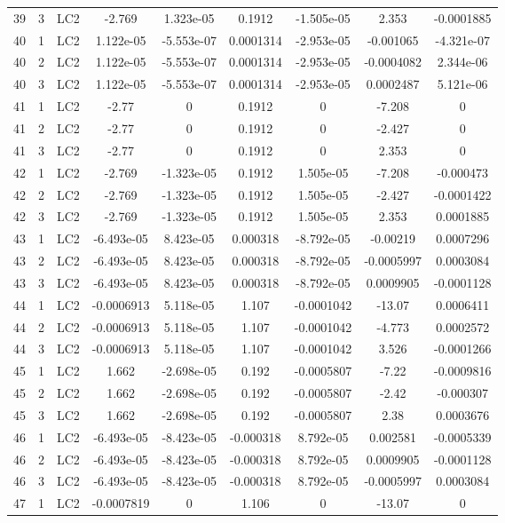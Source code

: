 \documentclass{article}%
\begin{document}
\begin{longtable}{| c c c | c c c c c c |}
39&3&LC2&{-}2.769&1.323e{-}05&0.1912&{-}1.505e{-}05&2.353&{-}0.0001885\\%
40&1&LC2&1.122e{-}05&{-}5.553e{-}07&0.0001314&{-}2.953e{-}05&{-}0.001065&{-}4.321e{-}07\\%
40&2&LC2&1.122e{-}05&{-}5.553e{-}07&0.0001314&{-}2.953e{-}05&{-}0.0004082&2.344e{-}06\\%
40&3&LC2&1.122e{-}05&{-}5.553e{-}07&0.0001314&{-}2.953e{-}05&0.0002487&5.121e{-}06\\%
41&1&LC2&{-}2.77&0&0.1912&0&{-}7.208&0\\%
41&2&LC2&{-}2.77&0&0.1912&0&{-}2.427&0\\%
41&3&LC2&{-}2.77&0&0.1912&0&2.353&0\\%
42&1&LC2&{-}2.769&{-}1.323e{-}05&0.1912&1.505e{-}05&{-}7.208&{-}0.000473\\%
42&2&LC2&{-}2.769&{-}1.323e{-}05&0.1912&1.505e{-}05&{-}2.427&{-}0.0001422\\%
42&3&LC2&{-}2.769&{-}1.323e{-}05&0.1912&1.505e{-}05&2.353&0.0001885\\%
43&1&LC2&{-}6.493e{-}05&8.423e{-}05&0.000318&{-}8.792e{-}05&{-}0.00219&0.0007296\\%
43&2&LC2&{-}6.493e{-}05&8.423e{-}05&0.000318&{-}8.792e{-}05&{-}0.0005997&0.0003084\\%
43&3&LC2&{-}6.493e{-}05&8.423e{-}05&0.000318&{-}8.792e{-}05&0.0009905&{-}0.0001128\\%
44&1&LC2&{-}0.0006913&5.118e{-}05&1.107&{-}0.0001042&{-}13.07&0.0006411\\%
44&2&LC2&{-}0.0006913&5.118e{-}05&1.107&{-}0.0001042&{-}4.773&0.0002572\\%
44&3&LC2&{-}0.0006913&5.118e{-}05&1.107&{-}0.0001042&3.526&{-}0.0001266\\%
45&1&LC2&1.662&{-}2.698e{-}05&0.192&{-}0.0005807&{-}7.22&{-}0.0009816\\%
45&2&LC2&1.662&{-}2.698e{-}05&0.192&{-}0.0005807&{-}2.42&{-}0.000307\\%
45&3&LC2&1.662&{-}2.698e{-}05&0.192&{-}0.0005807&2.38&0.0003676\\%
46&1&LC2&{-}6.493e{-}05&{-}8.423e{-}05&{-}0.000318&8.792e{-}05&0.002581&{-}0.0005339\\%
46&2&LC2&{-}6.493e{-}05&{-}8.423e{-}05&{-}0.000318&8.792e{-}05&0.0009905&{-}0.0001128\\%
46&3&LC2&{-}6.493e{-}05&{-}8.423e{-}05&{-}0.000318&8.792e{-}05&{-}0.0005997&0.0003084\\%
47&1&LC2&{-}0.0007819&0&1.106&0&{-}13.07&0\\%

\end{longtable}
\end{document}
